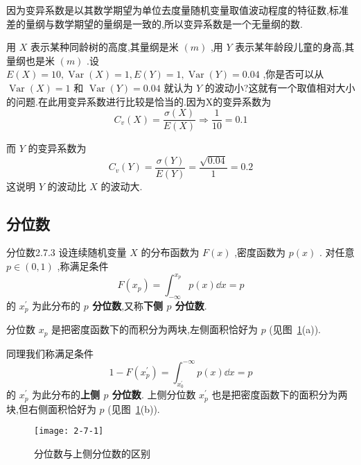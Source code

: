 因为变异系数是以其数学期望为单位去度量随机变量取值波动程度的特征数,标准差的量纲与数学期望的量纲是一致的,所以变异系数是一个无量纲的数.

\begin{example}\label{exam:2.7.2}
	用 $ X $ 表示某种同龄树的高度,其量纲是米 $ (m) $ ,用 $ Y $ 表示某年龄段儿童的身高,其量纲也是米 $ (m) $ .设 $ E(X)=10, \operatorname{Var}(X)=1, E(Y)=1, \operatorname{Var}(Y)=0.04 $ ,你是否可以从 $ \operatorname{Var}(X)=1 $ 和 $ \operatorname{Var}(Y)=0.04 $ 就认为 $ Y $ 的波动小?这就有一个取值相对大小的问题.在此用变异系数进行比较是恰当的.因为X的变异系数为
	\[
	C_{v}(X)=\frac{\sigma(X)}{E(X)} \Rightarrow \frac{1}{10}=0.1
	\]
	
	而 $ Y $ 的变异系数为
	\[
	C_{v}(Y)=\frac{\sigma(Y)}{E(Y)}=\frac{\sqrt{0.04}}{1}=0.2
	\]
	这说明 $ Y $ 的波动比 $ X $ 的波动大.
\end{example}

\subsection{分位数}\label{ssec:2.7.3}

\begin{definition}{分位数}{2.7.3}
	设连续随机变量 $ X $ 的分布函数为 $ F(x) $ ,密度函数为 $ p(x) $ .
	对任意 $ p \in(0,1) $ ,称满足条件
	\begin{equation}
	F\left(x_{p}\right)=\int_{-\infty}^{x_{p}} p(x) \dd x=p \label{eq:2.7.4}
	\end{equation}
	的 $ x_{p}^{\prime} $ 为此分布的 \textbf{ $ p $ 分位数},又称\textbf{下侧 $ p $ 分位数}.
	
	分位数 $ x_{p} $ 是把密度函数下的而积分为两块,左侧面积恰好为 $ p $ (见图~\ref{fig:2.7.1}(a)).
	
	同理我们称满足条件
	\begin{equation}
	1-F\left(x_{p}^{\prime}\right)=\int_{x_{0}^{\prime}}^{-\infty} p(x) \dd x=p \label{eq:2.7.5}
	\end{equation}
	的 $ x_{p}^{\prime} $ 为此分布的\textbf{上侧 $ p $ 分位数}.
	上侧分位数 $ x_{p}^{\prime} $ 也是把密度函数下的面积分为两块,但右侧面积恰好为 $ p $ (见图~\ref{fig:2.7.1}(b)).
\end{definition}

\begin{figure}
	\centering
	\texttt{[image: 2-7-1]}
	\caption{分位数与上侧分位数的区别}
	\label{fig:2.7.1}
\end{figure}

